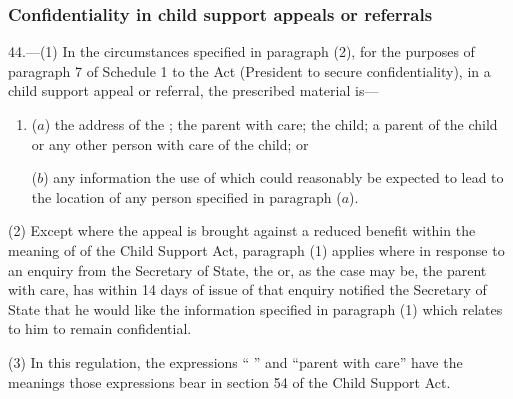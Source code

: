 \documentclass[12pt,a4paper]{article}
\begin{document}
\subsubsection[44. Confidentiality in child support appeals or referrals]{Confidentiality in child support appeals or referrals}

44.—(1) In the circumstances specified in paragraph (2), for the purposes of paragraph 7 of Schedule 1 to the Act (President to secure confidentiality), in a child support appeal or referral, the prescribed material is—
\begin{enumerate}\item[]
($a$) the address of the 
%
; the parent with care; the child; a parent of the child or any other person with care of the child; or

($b$) any information the use of which could reasonably be expected to lead to the location of any person specified in paragraph ($a$).
\end{enumerate}

(2) Except where the appeal is brought against a reduced benefit 
%
within the meaning of 
%
of the Child Support Act, paragraph (1) applies where in response to an enquiry from the Secretary of State, the 
%
or, as the case may be, the parent with care, has within 14 days of issue of that enquiry notified the Secretary of State that he would like the information specified in paragraph (1) which relates to him to remain confidential.

(3) In this regulation, the expressions “%
%
” and “parent with care” have the meanings those expressions bear in section 54 of the Child Support Act.

\end{document}
